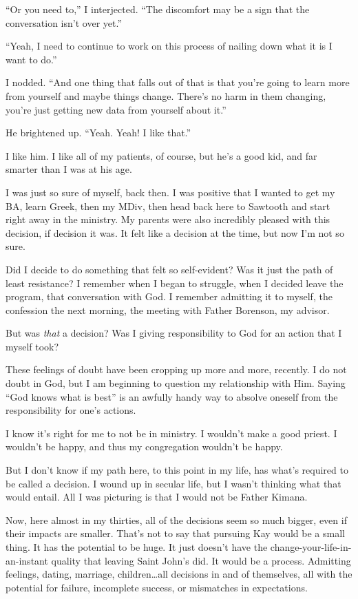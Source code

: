 ``Or you need to,'' I interjected. ``The discomfort may be a sign that the conversation isn't over yet.''

``Yeah, I need to continue to work on this process of nailing down what it is I want to do.''

I nodded. ``And one thing that falls out of that is that you're going to learn more from yourself and maybe things change. There's no harm in them changing, you're just getting new data from yourself about it.''

He brightened up. ``Yeah. Yeah! I like that.''

I like him. I like all of my patients, of course, but he's a good kid, and far smarter than I was at his age.

I was just so sure of myself, back then. I was positive that I wanted to get my BA, learn Greek, then my MDiv, then head back here to Sawtooth and start right away in the ministry. My parents were also incredibly pleased with this decision, if decision it was. It felt like a decision at the time, but now I'm not so sure.

Did I decide to do something that felt so self-evident? Was it just the path of least resistance? I remember when I began to struggle, when I decided leave the program, that conversation with God. I remember admitting it to myself, the confession the next morning, the meeting with Father Borenson, my advisor.

But was \emph{that} a decision? Was I giving responsibility to God for an action that I myself took?

These feelings of doubt have been cropping up more and more, recently. I do not doubt in God, but I am beginning to question my relationship with Him. Saying ``God knows what is best'' is an awfully handy way to absolve oneself from the responsibility for one's actions.

I know it's right for me to not be in ministry. I wouldn't make a good priest. I wouldn't be happy, and thus my congregation wouldn't be happy.

But I don't know if my path here, to this point in my life, has what's required to be called a decision. I wound up in secular life, but I wasn't thinking what that would entail. All I was picturing is that I would not be Father Kimana.

Now, here almost in my thirties, all of the decisions seem so much bigger, even if their impacts are smaller. That's not to say that pursuing Kay would be a small thing. It has the potential to be huge. It just doesn't have the change-your-life-in-an-instant quality that leaving Saint John's did. It would be a process. Admitting feelings, dating, marriage, children\ldots all decisions in and of themselves, all with the potential for failure, incomplete success, or mismatches in expectations.

